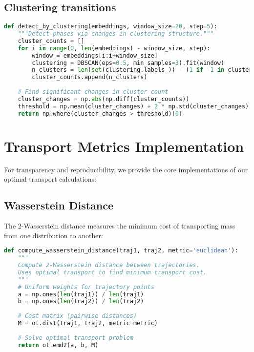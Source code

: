 \documentclass[11pt,letterpaper]{article}
\begin{document}
\subsection{Clustering transitions}
\label{app:phase-detection-clustering-transitions}
\begin{lstlisting}[language=Python]
def detect_by_clustering(embeddings, window_size=20, step=5):
    """Detect phases via changes in clustering structure."""
    cluster_counts = []
    for i in range(0, len(embeddings) - window_size, step):
        window = embeddings[i:i+window_size]
        clustering = DBSCAN(eps=0.5, min_samples=3).fit(window)
        n_clusters = len(set(clustering.labels_)) - (1 if -1 in clustering.labels_ else 0)
        cluster_counts.append(n_clusters)
    
    # Find significant changes in cluster count
    cluster_changes = np.abs(np.diff(cluster_counts))
    threshold = np.mean(cluster_changes) + 2 * np.std(cluster_changes)
    return np.where(cluster_changes > threshold)[0]
\end{lstlisting}

\section{Transport Metrics Implementation}
\label{app:transport}

For transparency and reproducibility, we provide the core implementations of our optimal transport calculations:

\subsection{Wasserstein Distance}

The 2-Wasserstein distance measures the minimum cost of transporting mass from one distribution to another:

\begin{lstlisting}[language=Python]
def compute_wasserstein_distance(traj1, traj2, metric='euclidean'):
    """
    Compute 2-Wasserstein distance between trajectories.
    Uses optimal transport to find minimum transport cost.
    """
    # Uniform weights for trajectory points
    a = np.ones(len(traj1)) / len(traj1)
    b = np.ones(len(traj2)) / len(traj2)
    
    # Cost matrix (pairwise distances)
    M = ot.dist(traj1, traj2, metric=metric)
    
    # Solve optimal transport problem
    return ot.emd2(a, b, M)
\end{lstlisting}
\end{document}
